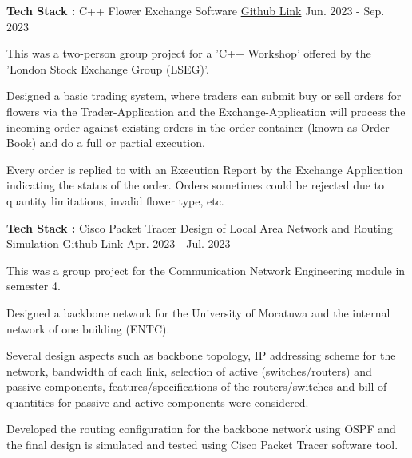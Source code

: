 \begin{cventries}
\cventry
{\textbf{Tech Stack :} C++} %
{Flower Exchange Software} %
{\href{https://github.com/VijthanKurrshanth/LSEG}{Github Link}} %
{Jun. 2023 - Sep. 2023} %
{ %
\begin{cvitems}
\item {This was a two-person group project for a 'C++ Workshop' offered by the 'London Stock Exchange Group (LSEG)'.}
\item {Designed a basic trading system, where traders can submit buy or sell orders for flowers via the Trader-Application and the Exchange-Application will process the incoming order against existing orders in the order container (known as Order Book) and do a full or partial execution.} 
\item {Every order is replied to with an Execution Report by the Exchange Application indicating the status of the order. Orders sometimes could be rejected due to quantity limitations, invalid flower type, etc.}
\end{cvitems}
}


\cventry
{\textbf{Tech Stack :} Cisco Packet Tracer} %
{Design of Local Area Network and Routing Simulation} %
{\href{https://github.com/VijthanKurrshanth/LAN-Design}{Github Link}} %
{Apr. 2023 - Jul. 2023} %
{ %
\begin{cvitems}
\item {This was a group project for the Communication Network Engineering module in semester 4.}
\item {Designed a backbone network for the University of Moratuwa and the internal network of one building (ENTC).} 
\item {Several design aspects such as backbone topology, IP addressing scheme for the network, bandwidth of each link, selection of active (switches/routers) and passive components, features/specifications of the routers/switches and bill of quantities for passive and active components were considered.}
\item {Developed the routing configuration for the backbone network using OSPF and the final design is simulated and tested using Cisco Packet Tracer software tool.}
\end{cvitems}
}



\end{cventries}

